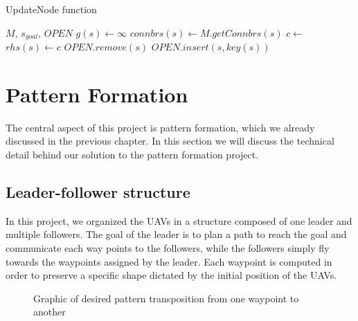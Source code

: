 \begin{algorithm}
	\algrenewcommand{}
	\algrenewcommand{}
	\caption{UpdateNode function}\label{alg:upnode}
	\begin{algorithmic}[1]
		\Require $M$, $s_{goal}$, $OPEN$
			\State $g(s) \gets \infty$
			\EndIf
			\State $connbrs(s) \gets M.getConnbrs(s)$
				\State $c \gets$ 
				\State $rhs(s) \gets c$ 
				\EndIf
			\EndFor
			\EndIf
			\State $OPEN.remove(s)$ 
			\EndIf
			\State $OPEN.insert(s, key(s))$ 
			\EndIf
		\EndFunction
	\end{algorithmic}
\end{algorithm}

\section{Pattern Formation}

The central aspect of this project is pattern formation, which we already
discussed in the previous chapter. In this section we will discuss the technical
detail behind our solution to the pattern formation project. 

\subsection{Leader-follower structure}

In this project, we organized the UAVs in a structure composed of one leader and
multiple followers. The goal of the leader is to plan a path to reach the goal
and communicate each way points to the followers, while the followers simply
fly towards the waypoints assigned by the leader. Each waypoint is computed in 
order to preserve a specific shape dictated by the initial position of the UAVs.

\begin{figure}[h]
	\begin{center}
		
	\end{center}
	\caption{Graphic of desired pattern transposition from one waypoint to another}\label{fig:pf-1}
\end{figure}

